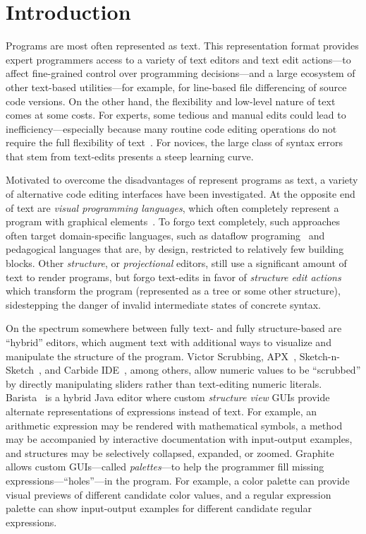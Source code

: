 \section{Introduction}
\label{sec:intro}

Programs are most often represented as text.
%
This representation format provides expert programmers access to a variety of
text editors and text edit actions---to affect fine-grained control over
programming decisions---and a large ecosystem of other text-based
utilities---for example, for line-based file differencing of source code
versions.
%
On the other hand, the flexibility and low-level nature of text comes at some
costs.
%
For experts, some tedious and manual edits could lead to
inefficiency---especially because many routine code editing operations do not
require the full flexibility of text~\citep{XXX}.
%
For novices, the large class of syntax errors that stem from text-edits presents
a steep learning curve.

Motivated to overcome the disadvantages of represent programs as text, a variety
of alternative code editing interfaces have been investigated.
%
At the opposite end of text are \emph{visual programming languages}, which often
completely represent a program with graphical elements~\citep{XXX}.
%
To forgo text completely, such approaches often target domain-specific
languages, such as dataflow programing~\citep{XXX} and pedagogical languages
that are, by design, restricted to relatively few building blocks.
%
Other \emph{structure}, or \emph{projectional} editors, still use a significant
amount of text to render programs, but forgo text-edits in favor of
\emph{structure edit actions} which transform the program (represented as a tree
or some other structure), sidestepping the danger of invalid intermediate states
of concrete syntax.

On the spectrum somewhere between fully text- and fully structure-based are
``hybrid'' editors, which augment text with additional ways to visualize and
manipulate the structure of the program.
%
Victor Scrubbing, APX~\citep{APX}, Sketch-n-Sketch~\citep{sns-pldi}, and Carbide
IDE~\citep{XXX}, among others, allow numeric values to be ``scrubbed'' by
directly manipulating sliders rather than text-editing numeric literals.
%
Barista~\cite{Barista} is a hybrid Java editor where custom \emph{structure
view} GUIs provide alternate representations of expressions instead of text.
%
For example, an arithmetic expression may be rendered with mathematical symbols,
a method may be accompanied by interactive documentation with input-output
examples, and structures may be selectively collapsed, expanded, or zoomed.
%
Graphite~\citep{Graphite} allows custom GUIs---called \emph{palettes}---to help
the programmer fill missing expressions---``holes''---in the program.
%
For example, a color palette can provide visual previews of different candidate
color values, and a regular expression palette can show input-output examples
for different candidate regular expressions.

